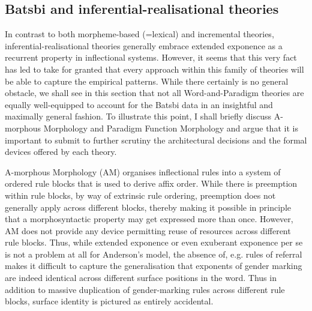 \documentclass[output=paper]{langsci/langscibook}
\begin{document}
\subsection{Batsbi and inferential-realisational theories}

In contrast to both morpheme-based (=lexical) and incremental
theories, in\-feren\-tial-realisa\-tional theories generally embrace
extended exponence as a recurrent property in inflectional systems.
However, it seems that this very fact has led \citet{Harris09} to take
for granted that every approach within this family of theories will be
able to capture the empirical patterns. While there certainly is no
general obstacle, we shall see in this section that not all
Word-and-Paradigm theories are equally well-equipped to account for
the Batsbi data in an insightful and maximally general fashion. To
illustrate this point, I shall briefly discuss A-morphous Morphology
\citep[=AM;][]{Anderson92} and Paradigm Function Morphology
\citep[=PFM;][]{Stump01} and argue that it is important to submit to
further scrutiny the architectural decisions and the formal devices
offered by each theory.

A-morphous Morphology (AM) organises inflectional rules into a system
of ordered rule blocks that is used to derive affix order. While there
is preemption within rule blocks, by way of extrinsic rule ordering,
preemption does not generally apply across different blocks, thereby
making it possible in principle that a morphosyntactic property may
get expressed more than once.  However, AM does not provide any device
permitting reuse of resources across different rule blocks. Thus, while
extended exponence or even exuberant exponence per se is not a problem
at all for Anderson's model, the absence of, e.g. rules of referral
makes it difficult to capture the generalisation that exponents of
gender marking are indeed identical across different surface positions
in the word. Thus in addition to massive duplication of gender-marking
rules across different rule blocks, surface identity is pictured as
entirely accidental. 
\end{document}
